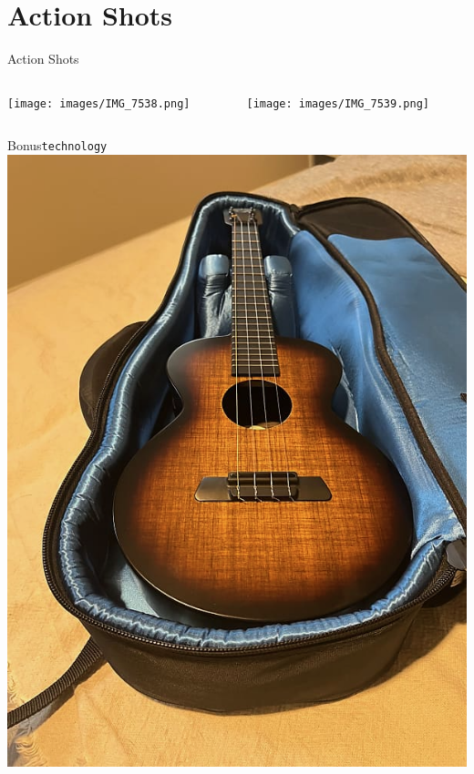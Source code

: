 \documentclass[aspectratio=169]{beamer}
\begin{document}
  \renewcommand{\sectitle}{Action Shots}
  \section{\sectitle}
  \begin{frame}{\sectitle}
    \begin{columns}
      \begin{column}{.5\textwidth}
        \centering\texttt{[image: images/IMG\_7538.png]}
      \end{column}
      \begin{column}{.5\textwidth}
        \centering\texttt{[image: images/IMG\_7539.png]}
      \end{column}
    \end{columns}
  \end{frame}


  \begin{frame}{Bonus}{\texttt{technology}}
    \centering\includegraphics[scale=.3, angle=270]{images/IMG_5145.png}
  \end{frame}
\end{document}
